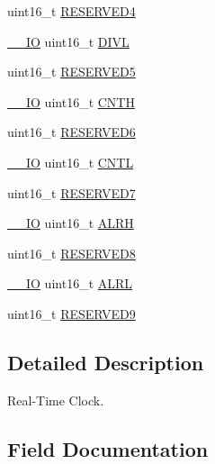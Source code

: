 \begin{DoxyCompactItemize}
\item 
uint16\+\_\+t \mbox{\hyperlink{struct_r_t_c___type_def_aa0223808025f5bf9c056185038c9d545}{R\+E\+S\+E\+R\+V\+E\+D4}}
\item 
\mbox{\hyperlink{core__sc300_8h_aec43007d9998a0a0e01faede4133d6be}{\+\_\+\+\_\+\+IO}} uint16\+\_\+t \mbox{\hyperlink{struct_r_t_c___type_def_a91336d70c8d95adebc32e7447af50468}{D\+I\+VL}}
\item 
uint16\+\_\+t \mbox{\hyperlink{struct_r_t_c___type_def_abd36010ac282682d1f3c641b183b1b6f}{R\+E\+S\+E\+R\+V\+E\+D5}}
\item 
\mbox{\hyperlink{core__sc300_8h_aec43007d9998a0a0e01faede4133d6be}{\+\_\+\+\_\+\+IO}} uint16\+\_\+t \mbox{\hyperlink{struct_r_t_c___type_def_af1fd5d58a8742246f90cf9123459e756}{C\+N\+TH}}
\item 
uint16\+\_\+t \mbox{\hyperlink{struct_r_t_c___type_def_aab502dde158ab7da8e7823d1f8a06edb}{R\+E\+S\+E\+R\+V\+E\+D6}}
\item 
\mbox{\hyperlink{core__sc300_8h_aec43007d9998a0a0e01faede4133d6be}{\+\_\+\+\_\+\+IO}} uint16\+\_\+t \mbox{\hyperlink{struct_r_t_c___type_def_af5920c3fba3983f8f77ad3f432ce31af}{C\+N\+TL}}
\item 
uint16\+\_\+t \mbox{\hyperlink{struct_r_t_c___type_def_ab1820c97e368d349f5f4121f015d9fab}{R\+E\+S\+E\+R\+V\+E\+D7}}
\item 
\mbox{\hyperlink{core__sc300_8h_aec43007d9998a0a0e01faede4133d6be}{\+\_\+\+\_\+\+IO}} uint16\+\_\+t \mbox{\hyperlink{struct_r_t_c___type_def_ab52f89131a817e029acde53284d77a2c}{A\+L\+RH}}
\item 
uint16\+\_\+t \mbox{\hyperlink{struct_r_t_c___type_def_afc22764fbf9ee7ce28174d65d0260f18}{R\+E\+S\+E\+R\+V\+E\+D8}}
\item 
\mbox{\hyperlink{core__sc300_8h_aec43007d9998a0a0e01faede4133d6be}{\+\_\+\+\_\+\+IO}} uint16\+\_\+t \mbox{\hyperlink{struct_r_t_c___type_def_addba7ef82d115360792637bb86c61c7c}{A\+L\+RL}}
\item 
uint16\+\_\+t \mbox{\hyperlink{struct_r_t_c___type_def_ad8b1fadb520f7a200ee0046e110edc79}{R\+E\+S\+E\+R\+V\+E\+D9}}
\end{DoxyCompactItemize}


\subsection{Detailed Description}
Real-\/\+Time Clock. 

\subsection{Field Documentation}
\mbox{\label{struct_r_t_c___type_def_ab52f89131a817e029acde53284d77a2c}} 
